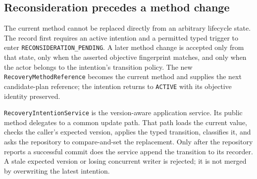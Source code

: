 \subsection{Reconsideration precedes a method change}
\label{subsec:ch23-reconsideration-method}

The current method cannot be replaced directly from an arbitrary lifecycle state. The record first requires an active intention and a permitted typed trigger to enter \texttt{RECONSIDERATION\_PENDING}. A later method change is accepted only from that state, only when the asserted objective fingerprint matches, and only when the actor belongs to the intention's transition policy. The new \texttt{RecoveryMethodReference} becomes the current method and supplies the next candidate-plan reference; the intention returns to \texttt{ACTIVE} with its objective identity preserved.

\texttt{RecoveryIntentionService} is the version-aware application service. Its public method delegates to a common update path. That path loads the current value, checks the caller's expected version, applies the typed transition, classifies it, and asks the repository to compare-and-set the replacement. Only after the repository reports a successful commit does the service append the transition to its recorder. A stale expected version or losing concurrent writer is rejected; it is not merged by overwriting the latest intention.

